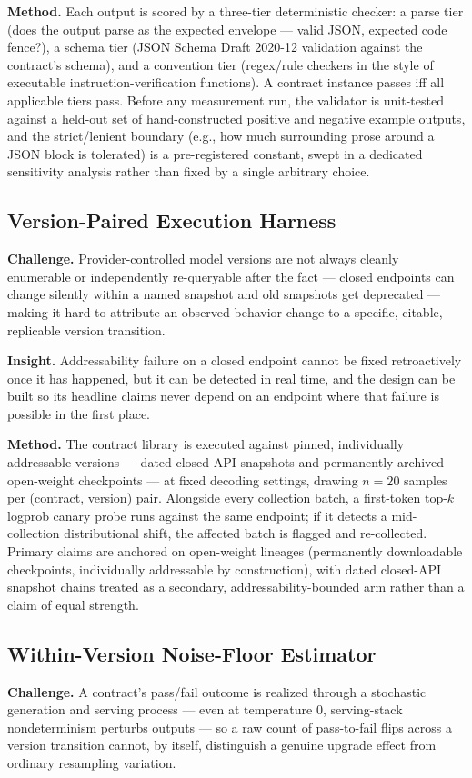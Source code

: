 \documentclass[11pt]{article}
\begin{document}
\textbf{Method.} Each output is scored by a three-tier deterministic checker: a parse tier (does the output parse as the expected envelope --- valid JSON, expected code fence?), a schema tier (JSON Schema Draft 2020-12 validation against the contract's schema), and a convention tier (regex/rule checkers in the style of executable instruction-verification functions). A contract instance passes iff all applicable tiers pass. Before any measurement run, the validator is unit-tested against a held-out set of hand-constructed positive and negative example outputs, and the strict/lenient boundary (e.g., how much surrounding prose around a JSON block is tolerated) is a pre-registered constant, swept in a dedicated sensitivity analysis rather than fixed by a single arbitrary choice.

\subsection{Version-Paired Execution Harness}
\textbf{Challenge.} Provider-controlled model versions are not always cleanly enumerable or independently re-queryable after the fact --- closed endpoints can change silently within a named snapshot and old snapshots get deprecated --- making it hard to attribute an observed behavior change to a specific, citable, replicable version transition.

\textbf{Insight.} Addressability failure on a closed endpoint cannot be fixed retroactively once it has happened, but it can be detected in real time, and the design can be built so its headline claims never depend on an endpoint where that failure is possible in the first place.

\textbf{Method.} The contract library is executed against pinned, individually addressable versions --- dated closed-API snapshots and permanently archived open-weight checkpoints --- at fixed decoding settings, drawing $n = 20$ samples per (contract, version) pair. Alongside every collection batch, a first-token top-$k$ logprob canary probe runs against the same endpoint; if it detects a mid-collection distributional shift, the affected batch is flagged and re-collected. Primary claims are anchored on open-weight lineages (permanently downloadable checkpoints, individually addressable by construction), with dated closed-API snapshot chains treated as a secondary, addressability-bounded arm rather than a claim of equal strength.

\subsection{Within-Version Noise-Floor Estimator}
\textbf{Challenge.} A contract's pass/fail outcome is realized through a stochastic generation and serving process --- even at temperature 0, serving-stack nondeterminism perturbs outputs --- so a raw count of pass-to-fail flips across a version transition cannot, by itself, distinguish a genuine upgrade effect from ordinary resampling variation.
\end{document}
